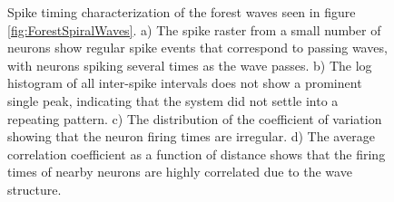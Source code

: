 \begin{figure}[!htb]
 \caption{Spike timing characterization of the forest waves seen in figure \ref{fig:ForestSpiralWaves}.
          a) The spike raster from a small number of neurons show regular spike events that correspond to passing waves, with neurons spiking several times as the wave passes.
          b) The log histogram of all inter-spike intervals does not show a prominent single peak, indicating that the system did not settle into a repeating pattern. 
          c) The distribution of the coefficient of variation showing that the neuron firing times are irregular.
          d) The average correlation coefficient as a function of distance shows that the firing times of nearby neurons are highly correlated due to the wave structure.
          } 
 \label{fig:ForestWave_SpikeTiming}
\end{figure}


